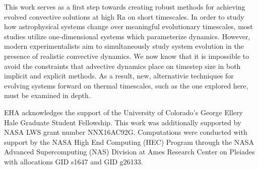 \documentclass[aps, pre, onecolumn, nofootinbib, notitlepage, groupedaddress, amsfonts, amssymb, amsmath, longbibliography]{revtex4-1}
\begin{document}
This work serves as a first step towards creating robust methods for
achieving evolved convective solutions at high Ra on short timescales.
In order to study how astrophysical systems change over meaningful
evolutionary timescales, most studies utilize one-dimensional
systems which parameterize dynamics. However, 
modern experimentalists aim to simultaneously study system evolution
in the presence of realistic convective dynamics. We now know that it is
impossible to avoid the constraints that advective dynamics place on
timestep size \cite{viallet&all2011, viallet&all2013, viallet&all2016}
in both implicit and explicit methods. As a result, new, alternativie techniques
for evolving systems forward on thermal timescales, such as the one explored
here, must be examined in depth.


\begin{acknowledgments}
EHA acknowledges the support of the University of Colorado's George 
Ellery Hale Graduate Student Fellowship.
This work was additionally supported by  NASA LWS grant number NNX16AC92G.  
Computations were conducted 
with support by the NASA High End Computing (HEC) Program through the NASA 
Advanced Supercomputing (NAS) Division at Ames Research Center on Pleiades
with allocations GID s1647 and GID g26133.
\end{acknowledgments}


\appendix
\end{document}
